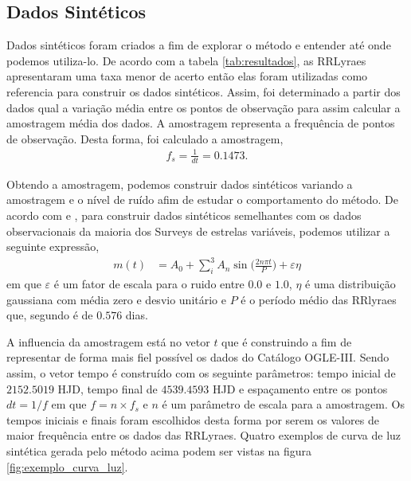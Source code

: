 \subsection{Dados Sintéticos}

Dados sintéticos foram criados a fim de explorar o método e entender até onde podemos utiliza-lo. De acordo com a tabela \ref{tab:resultados}, as RRLyraes apresentaram uma taxa menor de acerto então elas foram utilizadas como referencia para construir os dados sintéticos. Assim, foi determinado a partir dos dados qual a variação média entre os pontos de observação para assim calcular a amostragem média dos dados. A amostragem representa a frequência de pontos de observação. Desta forma, foi calculado a amostragem,
\begin{align}
f_s = \frac{1}{dt} = 0.1473 .
\end{align}

Obtendo a amostragem, podemos construir dados sintéticos variando a amostragem e o nível de ruído afim de estudar o comportamento do método. De acordo com \cite{ce} e \cite{entropy}, para construir dados sintéticos semelhantes com os dados observacionais da maioria dos Surveys de estrelas variáveis, podemos utilizar a seguinte expressão,
\begin{align}
m(t) &= A_0 + \sum_i^3 A_n \sin \Big( \frac{2 n \pi t}{P} \Big) + \varepsilon \eta
\end{align}
em que \(\varepsilon\) é um fator de escala para o ruido entre \(0.0\) e \(1.0\), \(\eta\) é uma distribuição gaussiana com média zero e desvio unitário e \(P\) é o período médio das RRlyraes que, segundo \cite{lyraes} é de \(0.576\) dias.

A influencia da amostragem está no vetor \(t\) que é construindo a fim de representar de forma mais fiel possível os dados do Catálogo OGLE-III. Sendo assim, o vetor tempo é construído com os seguinte parâmetros: tempo inicial de \(2152.5019\) HJD, tempo final de \(4539.4593\) HJD e espaçamento entre os pontos \(dt = 1 / f\) em que \(f = n \times f_s\) e \(n\) é um parâmetro de escala para a amostragem. Os tempos iniciais e finais foram escolhidos desta forma por serem os valores de maior frequência entre os dados das RRLyraes. Quatro exemplos de curva de luz sintética gerada pelo método acima podem ser vistas na figura \ref{fig:exemplo_curva_luz}. 

